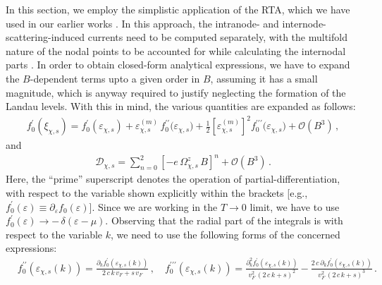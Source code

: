 \documentclass[aps,prb,onecolumn,nofootinbib,citeautoscript,10pt]{revtex4-2}
\begin{document}
In this section, we employ the simplistic application of the RTA, which we have used in our earlier works \cite{ips_rahul_ph_strain, rahul-jpcm, ips-ruiz, ips-rsw-ph, ips-shreya, ips-tilted, ips-internode, ips-spin1-ph}.
In this approach, the intranode- and internode-scattering-induced currents need to be computed separately, with the multifold nature of the nodal points to be accounted for while calculating the internodal parts \cite{ips-internode}. In order to obtain closed-form analytical expressions, we have to expand the $B $-dependent terms upto a given order in $B$, assuming it has a small magnitude, which is anyway required to justify neglecting the formation of the Landau levels. With this in mind, the various quantities are expanded as follows:
\begin{align}
f_0^\prime \left(\xi _{\chi ,s}\right) = f_0^\prime \left( \varepsilon_{\chi ,s}\right)
+ \varepsilon_{\chi ,s}^{(m)} \, f_0^{\prime \prime } \big ( \varepsilon_{\chi,s} \big )
+ \frac{1}{2} \left[ \varepsilon_{\chi ,s}^{(m)} \right ]^2 
f_0^{\prime \prime \prime}\big ( \varepsilon_{\chi ,s} \big ) + \mathcal{O} (B^3 )\,,
\end{align}
and
\begin{align}
\mathcal{D}_{\chi, s} = 
\sum \limits_{n=0}^{2} 
\left [ -e \,  \Omega_{\chi, s}^z \, B \right ]^n 
+ \mathcal{O} (B^3 )\,.
\end{align}
Here, the ``prime'' superscript denotes the operation of partial-differentiation, with respect to the variable shown explicitly within the brackets [e.g., $ f_0^\prime (\varepsilon) \equiv \partial_\varepsilon f_0 (\varepsilon)$]. 
Since we are working in the $T \rightarrow 0 $ limit, we have to use $f_0^\prime (\varepsilon) \rightarrow -\, 
\delta ( \varepsilon - \mu )$. Observing that the radial part of the integrals is with respect to the variable $k$, we need to use the following forms of the concerned expressions:
\begin{align}
& f_0^{\prime \prime } ( \varepsilon_{\chi ,s} (k) ) 
= \frac{ \partial_k f_0^\prime ( \varepsilon_{\chi ,s} (k) ) }
{2 \, c \, k \, v_F + s \, v_F} \,, \quad
f_0^{\prime \prime \prime} ( \varepsilon_{\chi ,s} (k) ) 
= \frac{ \partial^2_k f_0^\prime ( \varepsilon_{\chi ,s} (k) )
}  {v_F^2 \, (2 \, c\, k + s)^2 }
-
\frac{2 \,c\, \partial_k f_0^\prime ( \varepsilon_{\chi ,s} (k) ) 
}  {v_F^2 \, (2 \, c\, k + s)^3} \,.
\end{align}
\end{document}
